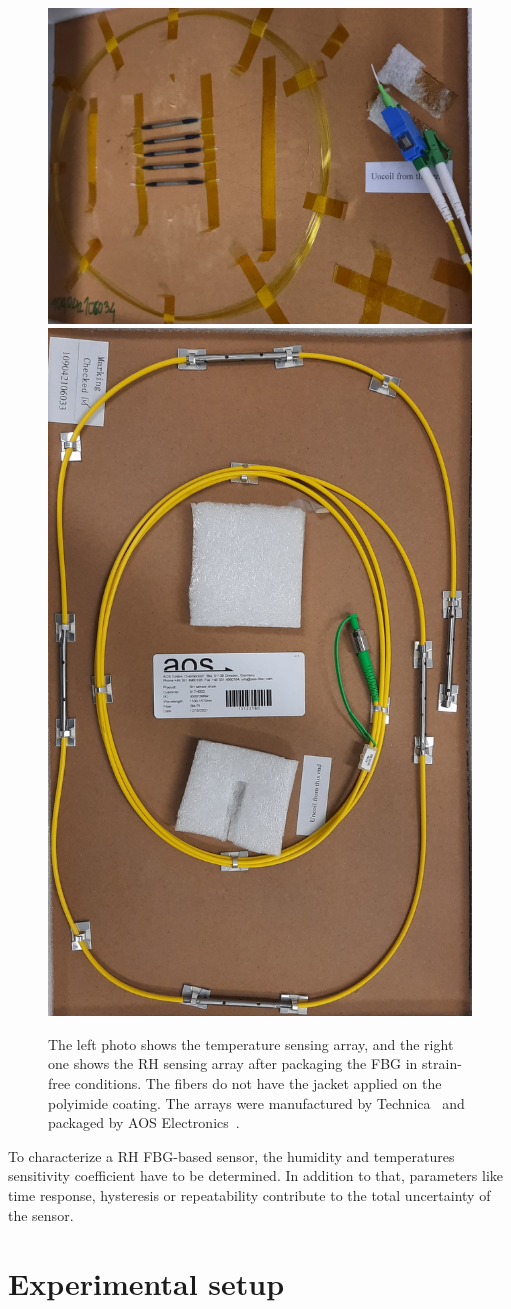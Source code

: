 \begin{figure}[!h]
\centering
\includegraphics[angle=90,width=0.43\columnwidth]{Chapter5/images/t_array1.jpg}
\includegraphics[angle=90,width=0.52\columnwidth]{Chapter5/images/rh_array1.jpg}
\caption{The left photo shows the temperature sensing array, and the right one shows the \gls{RH} sensing array after packaging the FBG in strain-free conditions. The fibers do not have the jacket applied on the polyimide coating. The arrays were manufactured by Technica~\cite{technica} and packaged by AOS Electronics~\cite{AOS}.}
\label{fig_array_photo}
\end{figure}
To characterize a RH FBG-based sensor, the humidity and temperatures sensitivity coefficient have to be determined. In addition to that, parameters like time response, hysteresis or repeatability contribute to the total uncertainty of the sensor. 
\section{Experimental setup}
\label{fos:setup}

